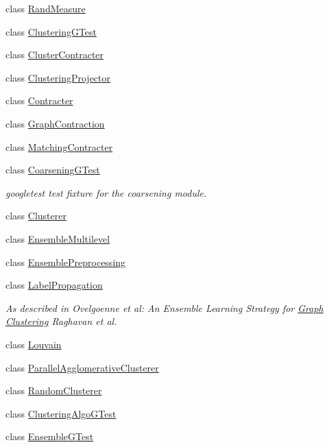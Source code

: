 \begin{DoxyCompactItemize}
class \hyperlink{class_networ_kit_1_1_rand_measure}{Rand\-Measure}
\item 
class \hyperlink{class_networ_kit_1_1_clustering_g_test}{Clustering\-G\-Test}
\item 
class \hyperlink{class_networ_kit_1_1_cluster_contracter}{Cluster\-Contracter}
\item 
class \hyperlink{class_networ_kit_1_1_clustering_projector}{Clustering\-Projector}
\item 
class \hyperlink{class_networ_kit_1_1_contracter}{Contracter}
\item 
class \hyperlink{class_networ_kit_1_1_graph_contraction}{Graph\-Contraction}
\item 
class \hyperlink{class_networ_kit_1_1_matching_contracter}{Matching\-Contracter}
\item 
class \hyperlink{class_networ_kit_1_1_coarsening_g_test}{Coarsening\-G\-Test}
\begin{DoxyCompactList}\small\item\em googletest test fixture for the coarsening module. \end{DoxyCompactList}\item 
class \hyperlink{class_networ_kit_1_1_clusterer}{Clusterer}
\item 
class \hyperlink{class_networ_kit_1_1_ensemble_multilevel}{Ensemble\-Multilevel}
\item 
class \hyperlink{class_networ_kit_1_1_ensemble_preprocessing}{Ensemble\-Preprocessing}
\item 
class \hyperlink{class_networ_kit_1_1_label_propagation}{Label\-Propagation}
\begin{DoxyCompactList}\small\item\em As described in Ovelgoenne et al\-: An Ensemble Learning Strategy for \hyperlink{class_networ_kit_1_1_graph}{Graph} \hyperlink{class_networ_kit_1_1_clustering}{Clustering} Raghavan et al. \end{DoxyCompactList}\item 
class \hyperlink{class_networ_kit_1_1_louvain}{Louvain}
\item 
class \hyperlink{class_networ_kit_1_1_parallel_agglomerative_clusterer}{Parallel\-Agglomerative\-Clusterer}
\item 
class \hyperlink{class_networ_kit_1_1_random_clusterer}{Random\-Clusterer}
\item 
class \hyperlink{class_networ_kit_1_1_clustering_algo_g_test}{Clustering\-Algo\-G\-Test}
\item 
class \hyperlink{class_networ_kit_1_1_ensemble_g_test}{Ensemble\-G\-Test}

\end{DoxyCompactItemize}
